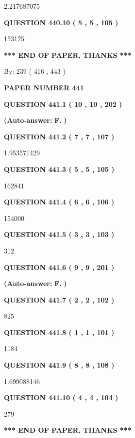 \documentclass{ctexart}
\begin{document}
2.217687075
  
  
{\textbf{\large{QUESTION
440.10 
 ( 5 , 5 , 105 )
}}}

153125
   
   
   
   
\vspace{1.0in} 
{\textbf{\large{ *** END OF PAPER, THANKS *** }}} 
   
   
\hspace{1.0in} By: 
 239 ( 416 ,  443 )
   
   
   
   
\newpage 
\setcounter{page}{ 
   441001 } 
   
   
 {\textbf{ \Large{ PAPER NUMBER  441  }}}
   
   
   
   
  
  
{\textbf{\large{QUESTION
441.1 
 ( 10 , 10 , 202 )
}}}
 
 
{\textbf{(Auto-answer:}}
{\textbf{\large{
F.}}}
{\textbf{)}}
 
 
  
  
{\textbf{\large{QUESTION
441.2 
 ( 7 , 7 , 107 )
}}}

1.953571429
  
  
{\textbf{\large{QUESTION
441.3 
 ( 5 , 5 , 105 )
}}}

162841
  
  
{\textbf{\large{QUESTION
441.4 
 ( 6 , 6 , 106 )
}}}

154000
  
  
{\textbf{\large{QUESTION
441.5 
 ( 3 , 3 , 103 )
}}}

312
  
  
{\textbf{\large{QUESTION
441.6 
 ( 9 , 9 , 201 )
}}}
 
 
{\textbf{(Auto-answer:}}
{\textbf{\large{
F.}}}
{\textbf{)}}
 
 
  
  
{\textbf{\large{QUESTION
441.7 
 ( 2 , 2 , 102 )
}}}

825
  
  
{\textbf{\large{QUESTION
441.8 
 ( 1 , 1 , 101 )
}}}

1184
  
  
{\textbf{\large{QUESTION
441.9 
 ( 8 , 8 , 108 )
}}}

1.699088146
  
  
{\textbf{\large{QUESTION
441.10 
 ( 4 , 4 , 104 )
}}}

279
   
   
   
   
\vspace{1.0in} 
{\textbf{\large{ *** END OF PAPER, THANKS *** }}} 
   
\end{document}
